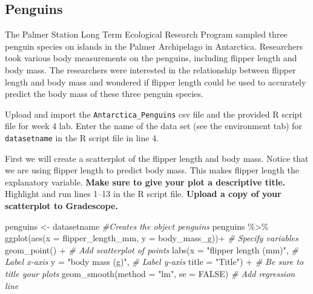 \documentclass[
]{report}
\newenvironment{Shaded}{\begin{snugshade}}{\end{snugshade}}
\newcommand{\AttributeTok}[1]{\textcolor[rgb]{0.77,0.63,0.00}{#1}}
\newcommand{\CommentTok}[1]{\textcolor[rgb]{0.56,0.35,0.01}{\textit{#1}}}
\newcommand{\ConstantTok}[1]{\textcolor[rgb]{0.00,0.00,0.00}{#1}}
\newcommand{\FunctionTok}[1]{\textcolor[rgb]{0.00,0.00,0.00}{#1}}
\newcommand{\NormalTok}[1]{#1}
\newcommand{\OtherTok}[1]{\textcolor[rgb]{0.56,0.35,0.01}{#1}}
\newcommand{\SpecialCharTok}[1]{\textcolor[rgb]{0.00,0.00,0.00}{#1}}
\newcommand{\StringTok}[1]{\textcolor[rgb]{0.31,0.60,0.02}{#1}}
\begin{document}
\hypertarget{penguins}{%
\subsection{Penguins}\label{penguins}}

The Palmer Station Long Term Ecological Research Program sampled three penguin species on islands in the Palmer Archipelago in Antarctica. Researchers took various body measurements on the penguins, including flipper length and body mass. The researchers were interested in the relationship between flipper length and body mass and wondered if flipper length could be used to accurately predict the body mass of these three penguin species.

Upload and import the \texttt{Antarctica\_Penguins} csv file and the provided R script file for week 4 lab. Enter the name of the data set (see the environment tab) for \texttt{datasetname} in the R script file in line 4.

First we will create a scatterplot of the flipper length and body mass. Notice that we are using flipper length to predict body mass. This makes flipper length the explanatory variable. \textbf{Make sure to give your plot a descriptive title.} Highlight and run lines 1--13 in the R script file. \textbf{Upload a copy of your scatterplot to Gradescope.}

\begin{Shaded}
\begin{Highlighting}[]
\NormalTok{penguins }\OtherTok{\textless{}{-}}\NormalTok{ datasetname }\CommentTok{\#Creates the object penguins}
\NormalTok{penguins }\SpecialCharTok{\%\textgreater{}\%}
  \FunctionTok{ggplot}\NormalTok{(}\FunctionTok{aes}\NormalTok{(}\AttributeTok{x =}\NormalTok{ flipper\_length\_mm, }\AttributeTok{y =}\NormalTok{ body\_mass\_g))}\SpecialCharTok{+}  \CommentTok{\# Specify variables}
  \FunctionTok{geom\_point}\NormalTok{() }\SpecialCharTok{+}  \CommentTok{\# Add scatterplot of points}
  \FunctionTok{labs}\NormalTok{(}\AttributeTok{x =} \StringTok{"flipper length (mm)"}\NormalTok{,  }\CommentTok{\# Label x{-}axis}
       \AttributeTok{y =} \StringTok{"body mass (g)"}\NormalTok{,  }\CommentTok{\# Label y{-}axis}
       \AttributeTok{title =} \StringTok{"Title"}\NormalTok{) }\SpecialCharTok{+} \CommentTok{\# Be sure to title your plots}
  \FunctionTok{geom\_smooth}\NormalTok{(}\AttributeTok{method =} \StringTok{"lm"}\NormalTok{, }\AttributeTok{se =} \ConstantTok{FALSE}\NormalTok{)  }\CommentTok{\# Add regression line}
\end{Highlighting}
\end{Shaded}
\end{document}
